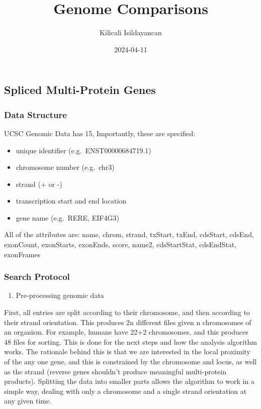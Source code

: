 \documentclass[
]{article}
\title{Genome Comparisons}
\author{Kilicali Isildayancan}
\date{2024-04-11}
\providecommand{\tightlist}{%
  \setlength{\itemsep}{0pt}\setlength{\parskip}{0pt}}
\begin{document}
\maketitle

\hypertarget{spliced-multi-protein-genes}{%
\subsection{Spliced Multi-Protein
Genes}\label{spliced-multi-protein-genes}}

\hypertarget{data-structure}{%
\subsubsection{Data Structure}\label{data-structure}}

UCSC Genomic Data has 15, Importantly, these are specified:

\begin{itemize}
\tightlist
\item
  unique identifier (e.g.~ENST00000684719.1)
\item
  chromosome number (e.g.~chr3)
\item
  strand (+ or -)
\item
  transcription start and end location
\item
  gene name (e.g.~RERE, EIF4G3)
\end{itemize}

All of the attributes are: name, chrom, strand, txStart, txEnd,
cdsStart, cdsEnd, exonCount, exonStarts, exonEnds, score, name2,
cdsStartStat, cdsEndStat, exonFrames

\hypertarget{search-protocol}{%
\subsubsection{Search Protocol}\label{search-protocol}}

\begin{enumerate}
\def\labelenumi{\arabic{enumi}.}
\tightlist
\item
  Pre-processing genomic data
\end{enumerate}

First, all entries are split according to their chromosome, and then
according to their strand orientation. This produces 2n different files
given n chromosomes of an organism. For example, humans have 22+2
chromosomes, and this produces 48 files for sorting. This is done for
the next steps and how the analysis algorithm works. The rationale
behind this is that we are interested in the local proximity of the any
one gene, and this is constrained by the chromosome and locus, as well
as the strand (reverse genes shouldn't produce meaningful multi-protein
products). Splitting the data into smaller parts allows the algorithm to
work in a simple way, dealing with only a chromosome and a single strand
orientation at any given time.
\end{document}
